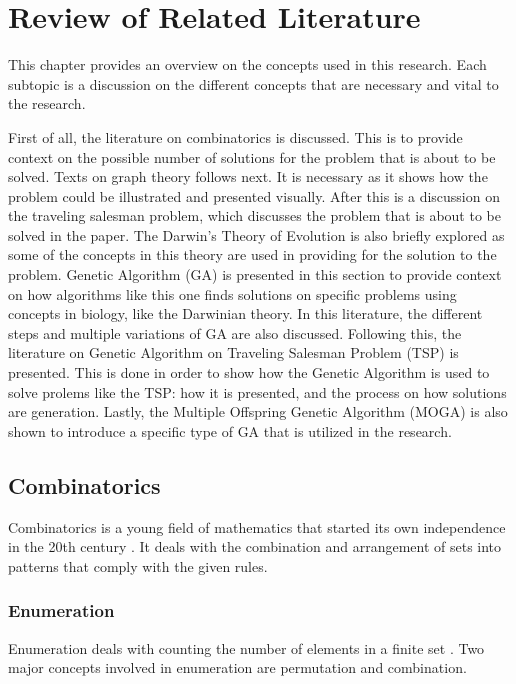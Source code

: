 \chapter{Review of Related Literature}
\label{chap:Review of Related literature}

 
 \indent \indent This chapter provides an overview on the concepts used in this research. Each subtopic is a discussion on the different concepts that are necessary and vital to the research.
 
 \indent \indent First of all, the literature on combinatorics is discussed. This is to provide context on the possible number of solutions for the problem that is about to be solved. Texts on graph theory follows next. It is necessary as it shows how the problem could be illustrated and presented visually. After this is a discussion on the traveling salesman problem, which discusses the problem that is about to be solved in the paper. The Darwin's Theory of Evolution is also briefly explored as some of the concepts in this theory are used in providing for the solution to the problem. Genetic Algorithm (GA) is presented in this section to provide context on how algorithms like this one finds solutions on specific problems using concepts in biology, like the Darwinian theory. In this literature, the different steps and multiple variations of GA are also discussed. Following this, the literature on Genetic Algorithm on Traveling Salesman Problem (TSP) is presented. This is done in order to show how the Genetic Algorithm is used to solve prolems like the TSP: how it is presented, and the process on how solutions are generation. Lastly, the Multiple Offspring Genetic Algorithm (MOGA) is also shown to introduce a specific type of GA that is utilized in the research.
 
\section{Combinatorics}
 \indent \indent Combinatorics is a young field of mathematics that started its own independence in the 20th century \cite{combinatorics}. It deals with the combination and arrangement of sets into patterns that comply with the given rules.  \par 

\subsection{Enumeration}
 \indent \indent Enumeration deals with counting the number of elements in a finite set \cite{stanley1986enumerative}. Two major concepts involved in enumeration are {permutation} and {combination}. 

